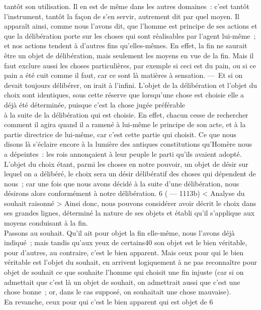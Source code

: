 \documentclass[french,twoside]{book} %
\begin{document}
tantôt son utilisation. Il en est de même dans les autres domaines : c’est tantôt l’instrument, tantôt la façon de s’en servir, autrement dit par quel moyen. Il apparaît ainsi, comme nous l’avons dit, que l’homme est principe de ses actions et que la délibération porte sur les choses qui sont réalisables par l’agent lui-même ; et nos actions tendent à d’autres fins qu’elles-mêmes. En effet, la fin ne saurait être un objet de délibération, mais seulement les moyens  en vue de la fin. Mais il faut exclure aussi les choses particulières, par exemple si ceci est du pain, ou si ce pain a été cuit comme il faut, car ce sont là matières à sensation. — Et si on devait toujours délibérer, on irait à l’infini. L’objet de la délibération et l’objet du choix sont identiques, sous cette réserve que lorsqu’une chose est choisie elle a déjà été déterminée, puisque c’est la chose jugée préférable \\
à la suite de la délibération qui est choisie. En effet, chacun cesse de rechercher comment il agira quand il a ramené à lui-même le principe de son acte, et à la partie directrice de lui-même, car c’est cette partie qui choisit. Ce que nous disons là s’éclaire encore à la lumière des antiques constitutions qu’Homère nous a dépeintes : les rois annonçaient à leur peuple le parti qu’ils avaient adopté. \\
L’objet du choix étant, parmi les choses en notre pouvoir, un objet de désir sur lequel on a délibéré, le choix sera un désir délibératif des choses qui dépendent de nous ; car une fois que nous avons décidé à la suite d’une délibération, nous désirons alors conformément à notre délibération. 6 ( — 1113b) < Analyse du souhait raisonné > Ainsi donc, nous pouvons considérer avoir décrit le choix dans ses grandes lignes, déterminé la nature de ses objets et établi qu’il s’applique aux moyens conduisant à la fin. \\
Passons au souhait. Qu’il ait pour objet la fin elle-même, nous l’avons déjà indiqué ; mais tandis qu’aux yeux de certains40 son objet est le bien véritable, pour d’autres, au contraire, c’est le bien apparent. Mais ceux pour qui le bien véritable est l’objet du souhait, en arrivent logiquement à ne pas reconnaître pour objet de souhait ce que souhaite l’homme qui choisit une fin injuste (car si on admettait que c’est là un objet de souhait, on admettrait aussi que c’est une chose bonne ; or, dans le cas supposé, on souhaitait une chose mauvaise). \\
En revanche, ceux pour qui c’est le bien apparent qui est objet de 6\\
\end{document}
